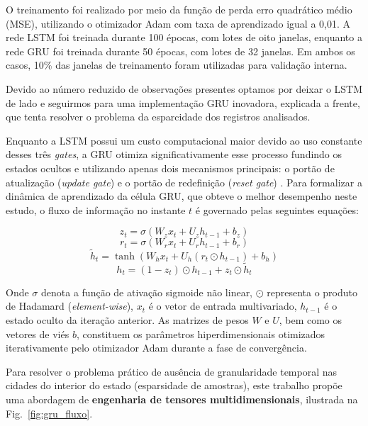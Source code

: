 \documentclass[10pt,conference]{IEEEtran}
\begin{document}
O treinamento foi realizado por meio da função de perda erro quadrático médio (MSE), utilizando o otimizador Adam com taxa de aprendizado igual a 0,01. A rede LSTM foi treinada durante 100 épocas, com lotes de oito janelas, enquanto a rede GRU foi treinada durante 50 épocas, com lotes de 32 janelas. Em ambos os casos, 10\% das janelas de treinamento foram utilizadas para validação interna.

Devido ao número reduzido de observações presentes optamos por deixar o LSTM de lado e seguirmos para uma implementação GRU inovadora, explicada a frente, que tenta resolver o problema da esparcidade dos registros analisados.

Enquanto a LSTM possui um custo computacional maior devido ao uso constante desses três \textit{gates}, a GRU otimiza significativamente esse processo fundindo os estados ocultos e utilizando apenas dois mecanismos principais: o portão de atualização (\textit{update gate}) e o portão de redefinição (\textit{reset gate}) \cite{cho2014learning}. Para formalizar a dinâmica de aprendizado da célula GRU, que obteve o melhor desempenho neste estudo, o fluxo de informação no instante $t$ é governado pelas seguintes equações:

$$z_t = \sigma(W_z x_t + U_z h_{t-1} + b_z)$$
$$r_t = \sigma(W_r x_t + U_r h_{t-1} + b_r)$$
$$\tilde{h}_t = \tanh(W_h x_t + U_h (r_t \odot h_{t-1}) + b_h)$$
$$h_t = (1 - z_t) \odot h_{t-1} + z_t \odot \tilde{h}_t$$

Onde $\sigma$ denota a função de ativação sigmoide não linear, $\odot$ representa o produto de Hadamard (\textit{element-wise}), $x_t$ é o vetor de entrada multivariado, $h_{t-1}$ é o estado oculto da iteração anterior. As matrizes de pesos $W$ e $U$, bem como os vetores de viés $b$, constituem os parâmetros hiperdimensionais otimizados iterativamente pelo otimizador Adam durante a fase de convergência.

Para resolver o problema prático de ausência de granularidade temporal nas cidades do interior do estado (esparsidade de amostras), este trabalho propõe uma abordagem de \textbf{engenharia de tensores multidimensionais}, ilustrada na Fig.~\ref{fig:gru_fluxo}.
\end{document}
